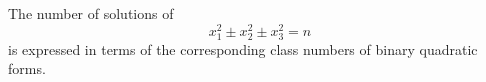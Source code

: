 \begin{proposition}\label{eq:025}
    The number of solutions of
\[
    x_1^2\pm x_2^2\pm x_3^2=n
\]
    is expressed in terms of the corresponding class numbers of binary quadratic forms.
\end{proposition}
